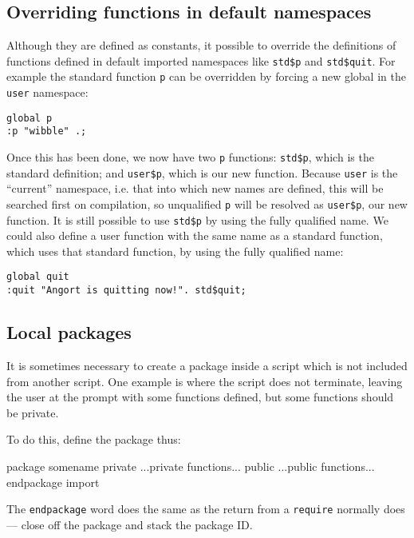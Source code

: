 \subsection{Overriding functions in default namespaces}
Although they are defined as constants, it possible to override the definitions of functions defined
in default imported namespaces
like \texttt{std\$p} and \texttt{std\$quit}. For example the standard function \texttt{p}
can be overridden by forcing a
new global in the \texttt{user} namespace:
\begin{lstlisting}
global p
:p "wibble" .;
\end{lstlisting}
Once this has been done, we now have two \texttt{p} functions: \texttt{std\$p}, which is
the standard definition; and \texttt{user\$p}, which is our new function. Because \texttt{user} is
the ``current'' namespace, i.e. that into which new names are defined, this will be searched
first on compilation, so unqualified \texttt{p} will be resolved as \texttt{user\$p}, our new function.
It is still possible to use \texttt{std\$p} by using the fully qualified name. We could also
define a user function with the same name as a standard function, which uses that standard function,
by using the fully qualified name:
\begin{lstlisting}
global quit
:quit "Angort is quitting now!". std$quit;
\end{lstlisting}
 


\subsection{Local packages}
It is sometimes necessary to create a package inside a script which
is not included from another script. One example is where the script
does not terminate, leaving the user at the prompt with some functions defined,
but some functions should be private.

To do this, define the package thus:
\begin{v}
package somename
private
...private functions...
public
...public functions...
endpackage import
\end{v}
The \texttt{endpackage} word does the same as the return from a 
\texttt{require} normally does --- close off the package and
stack the package ID.

